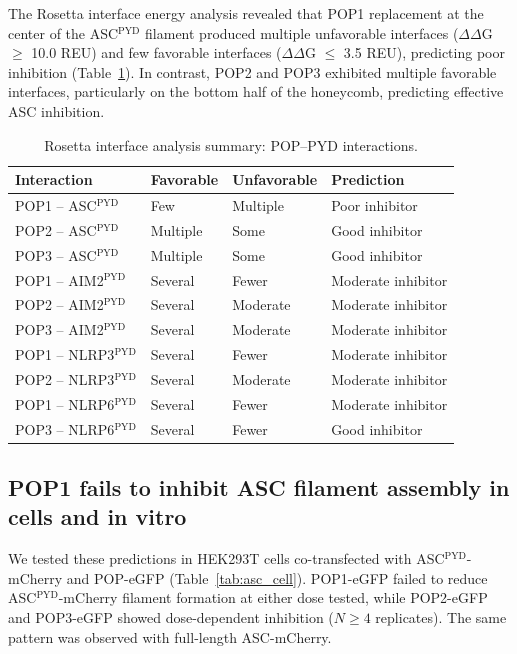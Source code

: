 \documentclass[11pt,a4paper]{article}
\begin{document}
The Rosetta interface energy analysis revealed that POP1 replacement at the center of the ASC$^{\text{PYD}}$ filament produced multiple unfavorable interfaces ($\Delta\Delta$G $\geq$ 10.0 REU) and few favorable interfaces ($\Delta\Delta$G $\leq$ 3.5 REU), predicting poor inhibition (Table~\ref{tab:rosetta_pops}). In contrast, POP2 and POP3 exhibited multiple favorable interfaces, particularly on the bottom half of the honeycomb, predicting effective ASC inhibition.

\begin{table}[htbp]
\centering
\caption{Rosetta interface analysis summary: POP--PYD interactions.}
\label{tab:rosetta_pops}
\small
\begin{tabular}{llll}
\toprule
\textbf{Interaction} & \textbf{Favorable} & \textbf{Unfavorable} & \textbf{Prediction} \\
\midrule
POP1 -- ASC$^{\text{PYD}}$ & Few & Multiple & Poor inhibitor \\
POP2 -- ASC$^{\text{PYD}}$ & Multiple & Some & Good inhibitor \\
POP3 -- ASC$^{\text{PYD}}$ & Multiple & Some & Good inhibitor \\
POP1 -- AIM2$^{\text{PYD}}$ & Several & Fewer & Moderate inhibitor \\
POP2 -- AIM2$^{\text{PYD}}$ & Several & Moderate & Moderate inhibitor \\
POP3 -- AIM2$^{\text{PYD}}$ & Several & Moderate & Moderate inhibitor \\
POP1 -- NLRP3$^{\text{PYD}}$ & Several & Fewer & Moderate inhibitor \\
POP2 -- NLRP3$^{\text{PYD}}$ & Several & Moderate & Moderate inhibitor \\
POP1 -- NLRP6$^{\text{PYD}}$ & Several & Fewer & Moderate inhibitor \\
POP3 -- NLRP6$^{\text{PYD}}$ & Several & Fewer & Good inhibitor \\
\bottomrule
\end{tabular}
\end{table}

\subsection{POP1 fails to inhibit ASC filament assembly in cells and in vitro}

We tested these predictions in HEK293T cells co-transfected with ASC$^{\text{PYD}}$-mCherry and POP-eGFP (Table~\ref{tab:asc_cell}). POP1-eGFP failed to reduce ASC$^{\text{PYD}}$-mCherry filament formation at either dose tested, while POP2-eGFP and POP3-eGFP showed dose-dependent inhibition ($N \geq 4$ replicates). The same pattern was observed with full-length ASC-mCherry.
\end{document}
